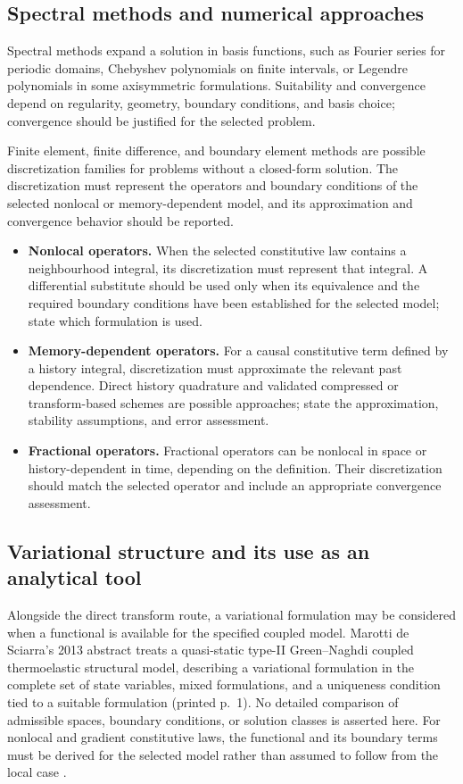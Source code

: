 \subsection{Spectral methods and numerical approaches}
\label{sec:8.8}

Spectral methods expand a solution in basis functions, such as Fourier series for periodic domains, Chebyshev polynomials on finite intervals, or Legendre polynomials in some axisymmetric formulations. Suitability and convergence depend on regularity, geometry, boundary conditions, and basis choice; convergence should be justified for the selected problem.

Finite element, finite difference, and boundary element methods are possible discretization families for problems without a closed-form solution. The discretization must represent the operators and boundary conditions of the selected nonlocal or memory-dependent model, and its approximation and convergence behavior should be reported.

\begin{itemize}
\item \textbf{Nonlocal operators.} When the selected constitutive law contains a neighbourhood integral, its discretization must represent that integral. A differential substitute should be used only when its equivalence and the required boundary conditions have been established for the selected model; state which formulation is used.
\item \textbf{Memory-dependent operators.} For a causal constitutive term defined by a history integral, discretization must approximate the relevant past dependence. Direct history quadrature and validated compressed or transform-based schemes are possible approaches; state the approximation, stability assumptions, and error assessment.
\item \textbf{Fractional operators.} Fractional operators can be nonlocal in space or history-dependent in time, depending on the definition. Their discretization should match the selected operator and include an appropriate convergence assessment.
\end{itemize}

\subsection{Variational structure and its use as an analytical tool}
\label{sec:8.9}

Alongside the direct transform route, a variational formulation may be considered when a functional is available for the specified coupled model. Marotti de Sciarra's 2013 abstract treats a quasi-static type-II Green--Naghdi coupled thermoelastic structural model, describing a variational formulation in the complete set of state variables, mixed formulations, and a uniqueness condition tied to a suitable formulation (printed p.~1). No detailed comparison of admissible spaces, boundary conditions, or solution classes is asserted here. For nonlocal and gradient constitutive laws, the functional and its boundary terms must be derived for the selected model rather than assumed to follow from the local case \cite{Marotti2013}.


